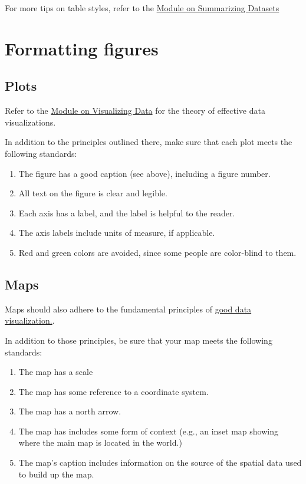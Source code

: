 \documentclass[]{book}
\providecommand{\tightlist}{%
  \setlength{\itemsep}{0pt}\setlength{\parskip}{0pt}}
\begin{document}
For more tips on table styles, refer to the \protect\hyperlink{tables}{Module on Summarizing Datasets}

\hypertarget{formatting-figures}{%
\section*{Formatting figures}\label{formatting-figures}}

\hypertarget{plots}{%
\subsection*{Plots}\label{plots}}

Refer to the \protect\hyperlink{dataviz}{Module on Visualizing Data} for the theory of effective data visualizations.

In addition to the principles outlined there, make sure that each plot meets the following standards:

\begin{enumerate}
\def\labelenumi{\arabic{enumi}.}
\tightlist
\item
  The figure has a good caption (see above), including a figure number.\\
\item
  All text on the figure is clear and legible.
\item
  Each axis has a label, and the label is helpful to the reader.
\item
  The axis labels include units of measure, if applicable.
\item
  Red and green colors are avoided, since some people are color-blind to them.
\end{enumerate}

\hypertarget{maps}{%
\subsection*{Maps}\label{maps}}

Maps should also adhere to the fundamental principles of \protect\hyperlink{datavis}{good data visualization.}.

In addition to those principles, be sure that your map meets the following standards:

\begin{enumerate}
\def\labelenumi{\arabic{enumi}.}
\tightlist
\item
  The map has a scale\\
\item
  The map has some reference to a coordinate system.\\
\item
  The map has a north arrow.\\
\item
  The map has includes some form of context (e.g., an inset map showing where the main map is located in the world.)\\
\item
  The map's caption includes information on the source of the spatial data used to build up the map.
\end{enumerate}
\end{document}
